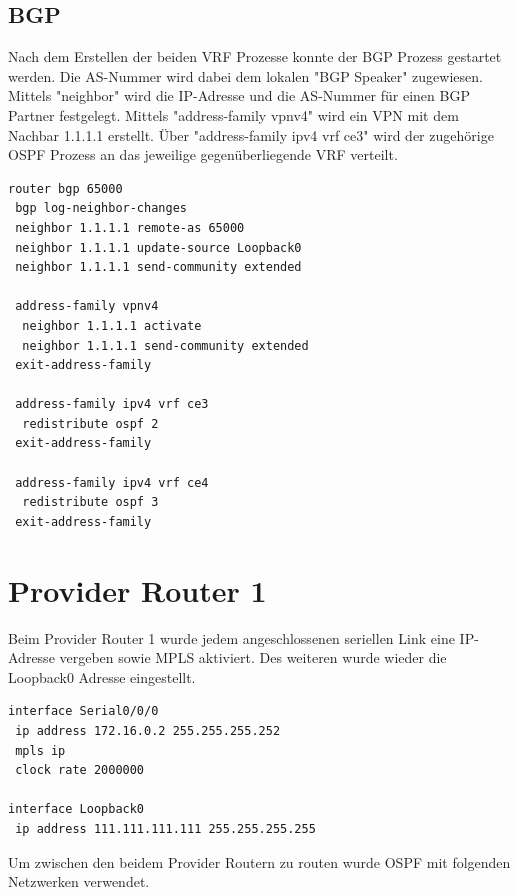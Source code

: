 \section{BGP}

Nach dem Erstellen der beiden \ac{VRF} Prozesse konnte der \ac{BGP} Prozess gestartet werden. Die \ac{AS}-Nummer wird dabei dem lokalen "\ac{BGP} Speaker" zugewiesen. Mittels "neighbor" wird die \ac{IP}-Adresse und die \ac{AS}-Nummer für einen \ac{BGP} Partner festgelegt. Mittels "address-family vpnv4" wird ein \ac{VPN} mit dem Nachbar 1.1.1.1 erstellt. Über "address-family ipv4 vrf ce3" wird der zugehörige \ac{OSPF} Prozess an das jeweilige gegenüberliegende \ac{VRF} verteilt.

\begin{lstlisting}[caption={BGP Process},label={lst:mon6},language={}]
router bgp 65000
 bgp log-neighbor-changes
 neighbor 1.1.1.1 remote-as 65000
 neighbor 1.1.1.1 update-source Loopback0
 neighbor 1.1.1.1 send-community extended
 
 address-family vpnv4
  neighbor 1.1.1.1 activate
  neighbor 1.1.1.1 send-community extended
 exit-address-family
 
 address-family ipv4 vrf ce3
  redistribute ospf 2
 exit-address-family
 
 address-family ipv4 vrf ce4
  redistribute ospf 3
 exit-address-family
\end{lstlisting}

\chapter{Provider Router 1}

Beim Provider Router 1 wurde jedem angeschlossenen seriellen Link eine \ac{IP}-Adresse vergeben sowie \ac{MPLS} aktiviert.
Des weiteren wurde wieder die Loopback0 Adresse eingestellt. 

\begin{lstlisting}[caption={MPLS und Loopback0 auf P-Router},label={lst:mon8},language={}]
interface Serial0/0/0
 ip address 172.16.0.2 255.255.255.252
 mpls ip
 clock rate 2000000
 
interface Loopback0
 ip address 111.111.111.111 255.255.255.255
\end{lstlisting}

Um zwischen den beidem Provider Routern zu routen wurde \ac{OSPF} mit folgenden Netzwerken verwendet.

